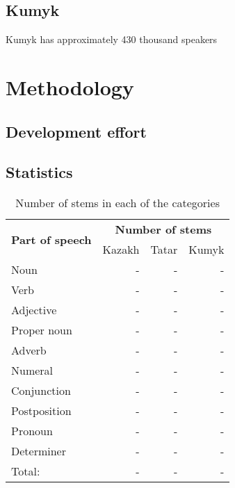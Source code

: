 \documentclass[a4paper,11pt,twocolumn]{article}
\begin{document}
\subsection{Kumyk}
Kumyk has approximately 430 thousand speakers \cite{ethnologue}

\cite{bammatov1960}
\cite{olmesov2000}

\section{Methodology}



\subsection{Development effort}

\subsection{Statistics}

\begin{table}
\begin{center}
\begin{tabular}{|l|rrr|}
		\hline
\multirow{2}{*}{\textbf{Part of speech}} & \multicolumn{3}{|c|}{\textbf{Number of stems}} \\ \cline{2-4}
                        & Kazakh & Tatar & Kumyk \\
		\hline
		Noun & - & - & - \\
		Verb & - & - & - \\
		Adjective & - & - & - \\
		Proper noun & - & - & - \\
		Adverb & - & - & - \\
		Numeral & - & - & - \\
		Conjunction & - & - & - \\
		Postposition & - & - & - \\
		Pronoun & - & - & - \\
		Determiner & - & - & - \\
		\hline
		Total: & - & - & - \\
		\hline
\end{tabular}
 \caption{Number of stems in each of the categories}
 \label{table:coverage}
\end{center}

\end{table}
\end{document}
